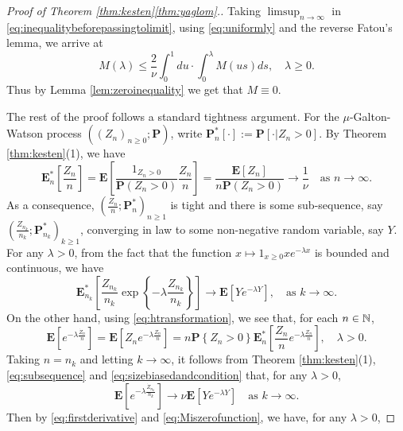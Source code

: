 \documentclass[12pt]{amsart}
\numberwithin{equation}{section}
\newcommand{\prob}{\mathbf P}
\newcommand{\brac}[1]{\left[ #1 \right]}
\newcommand{\set}[1]{\left\{ #1 \right\}}
\newcommand{\expct}{\mathbf E}
\begin{document}
\begin{proof}[Proof of Theorem \ref{thm:kesten}\eqref{thm:yaglom}.]
    Taking $\limsup_{n\to\infty}$ in
    \eqref{eq:inequalitybeforepassingtolimit}, using \eqref{eq:uniformly} and the reverse Fatou's lemma, we arrive at
\begin{equation*}
	    M(\lambda)
    \leq
        \frac{2}{\nu}\int_0^1du
    \cdot
    	\int_0^\lambda M(us)ds,
    \quad
    	\lambda\geq 0.
\end{equation*}
	Thus by Lemma \ref{lem:zeroinequality} we get that $M\equiv 0$.
\par
	The rest of the proof follows a standard tightness argument.
For the $\mu$-Galton-Watson process $((Z_n)_{n\ge 0};\prob)$,
	write $\prob_n^*[\cdot]:=\prob[\cdot|Z_n>0]$.
By Theorem \ref{thm:kesten}(1), we have
\begin{equation*}
	    \expct_n^*\brac{\frac{Z_n}{n}}
	=
		 \expct\brac{\frac{1_{Z_n>0}}{\prob(Z_n>0)}\frac{Z_n}{n}}
	=
	   	     \frac{\expct\brac{Z_n}}{n\prob(Z_n>0)}
    \to
        \frac{1}{\nu}
   \quad
				\text{as }n\to\infty.
\end{equation*}
	As a consequence, $(\frac{Z_n}{n};\prob_n^*)_{n\ge 1}$ is tight and there is some sub-sequence, say $(\frac{Z_{n_k}}{n_k};\prob_{n_k}^*)_{k\ge 1}$, converging in law to some non-negative random variable, say $Y$.
		For any $\lambda > 0$,
	from the fact that the function $x\mapsto 1_{x\geq 0}xe^{-\lambda x}$ is bounded and continuous, we have
\begin{equation}
\label{eq:subsequence}
	    \expct_{n_k}^*\brac{\frac{Z_{n_k}}{n_k}\exp\set{-\lambda\frac{Z_{n_k}}{n_k}}}
	\to
	    \expct\brac{Ye^{-\lambda Y}},
	\quad
				\text{as }k\to\infty.
\end{equation}
	On the other hand, using \eqref{eq:htransformation}, we see that, for each $n\in\mathbb N$,
\begin{equation}
\label{eq:sizebiasedandcondition}
	    \expct\brac{e^{-\lambda\frac{\dot Z_n}{n}}}
	=
	    \expct\brac{Z_n e^{-\lambda\frac{Z_n}{n}}}
	=
		n\prob\set{Z_n>0}\expct_n^*\brac{\frac{Z_n}{n}e^{-\lambda\frac{Z_n}{n}}},
		\quad \lambda > 0.
	\end{equation}
	Taking $n=n_k$ and letting $k\to\infty$, it follows from
Theorem \ref{thm:kesten}(1),
	\eqref{eq:subsequence} and \eqref{eq:sizebiasedandcondition} that,
		for any $\lambda >0$,
	\begin{equation*}
	    \expct\brac{e^{-\lambda\frac{\dot Z_{n_k}}{n_k}}}
	\to
		\nu\expct\brac{Ye^{-\lambda Y}}
		\quad
		\text{as } k\to \infty.
	\end{equation*}
	Then by \eqref{eq:firstderivative} and \eqref{eq:Miszerofunction}, we have, for any $\lambda >0$,

\end{proof}
\end{document}
